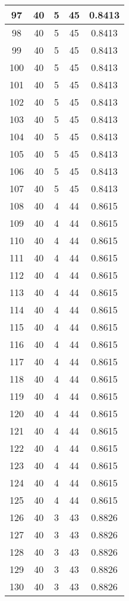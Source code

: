 \documentclass[letterpaper, 12pt]{article}
\begin{document}
\begin{longtable}{|c|c|c|c|c|}
\hline
97 & 40 & 5 & 45 & 0.8413 \\
\hline
98 & 40 & 5 & 45 & 0.8413 \\
\hline
99 & 40 & 5 & 45 & 0.8413 \\
\hline
100 & 40 & 5 & 45 & 0.8413 \\
\hline
101 & 40 & 5 & 45 & 0.8413 \\
\hline
102 & 40 & 5 & 45 & 0.8413 \\
\hline
103 & 40 & 5 & 45 & 0.8413 \\
\hline
104 & 40 & 5 & 45 & 0.8413 \\
\hline
105 & 40 & 5 & 45 & 0.8413 \\
\hline
106 & 40 & 5 & 45 & 0.8413 \\
\hline
107 & 40 & 5 & 45 & 0.8413 \\
\hline
108 & 40 & 4 & 44 & 0.8615 \\
\hline
109 & 40 & 4 & 44 & 0.8615 \\
\hline
110 & 40 & 4 & 44 & 0.8615 \\
\hline
111 & 40 & 4 & 44 & 0.8615 \\
\hline
112 & 40 & 4 & 44 & 0.8615 \\
\hline
113 & 40 & 4 & 44 & 0.8615 \\
\hline
114 & 40 & 4 & 44 & 0.8615 \\
\hline
115 & 40 & 4 & 44 & 0.8615 \\
\hline
116 & 40 & 4 & 44 & 0.8615 \\
\hline
117 & 40 & 4 & 44 & 0.8615 \\
\hline
118 & 40 & 4 & 44 & 0.8615 \\
\hline
119 & 40 & 4 & 44 & 0.8615 \\
\hline
120 & 40 & 4 & 44 & 0.8615 \\
\hline
121 & 40 & 4 & 44 & 0.8615 \\
\hline
122 & 40 & 4 & 44 & 0.8615 \\
\hline
123 & 40 & 4 & 44 & 0.8615 \\
\hline
124 & 40 & 4 & 44 & 0.8615 \\
\hline
125 & 40 & 4 & 44 & 0.8615 \\
\hline
126 & 40 & 3 & 43 & 0.8826 \\
\hline
127 & 40 & 3 & 43 & 0.8826 \\
\hline
128 & 40 & 3 & 43 & 0.8826 \\
\hline
129 & 40 & 3 & 43 & 0.8826 \\
\hline
130 & 40 & 3 & 43 & 0.8826 \\

\end{longtable}
\end{document}

